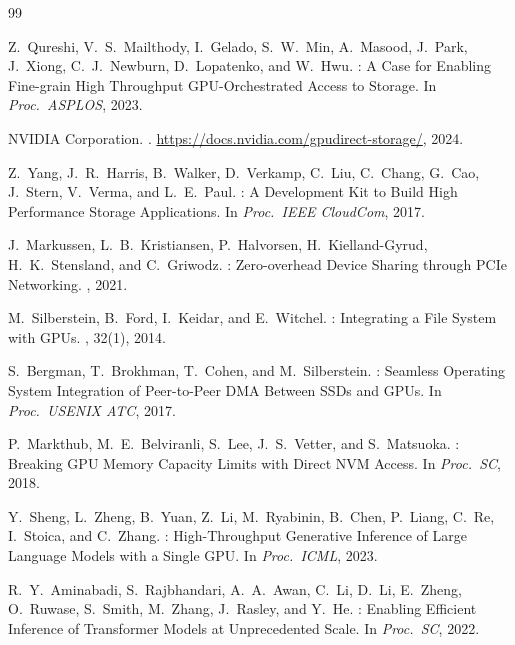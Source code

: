 \documentclass{article}
\begin{document}
\begin{thebibliography}{99}

Z.~Qureshi, V.~S.~Mailthody, I.~Gelado, S.~W.~Min, A.~Masood, J.~Park,
J.~Xiong, C.~J.~Newburn, D.~Lopatenko, and W.~Hwu.
: A Case for Enabling Fine-grain High Throughput
  {GPU}-Orchestrated Access to Storage.
\newblock In {\em Proc.\ ASPLOS}, 2023.

{NVIDIA Corporation}.
.
\newblock \url{https://docs.nvidia.com/gpudirect-storage/}, 2024.

Z.~Yang, J.~R.~Harris, B.~Walker, D.~Verkamp, C.~Liu, C.~Chang, G.~Cao,
J.~Stern, V.~Verma, and L.~E.~Paul.
: A Development Kit to Build High Performance Storage
  Applications.
\newblock In {\em Proc.\ IEEE CloudCom}, 2017.

J.~Markussen, L.~B.~Kristiansen, P.~Halvorsen, H.~Kielland-Gyrud,
H.~K.~Stensland, and C.~Griwodz.
: Zero-overhead Device Sharing through {PCIe} Networking.
, 2021.

M.~Silberstein, B.~Ford, I.~Keidar, and E.~Witchel.
: Integrating a File System with {GPUs}.
, 32(1), 2014.

S.~Bergman, T.~Brokhman, T.~Cohen, and M.~Silberstein.
: Seamless Operating System Integration of Peer-to-Peer {DMA}
  Between {SSDs} and {GPUs}.
\newblock In {\em Proc.\ USENIX ATC}, 2017.

P.~Markthub, M.~E.~Belviranli, S.~Lee, J.~S.~Vetter, and S.~Matsuoka.
: Breaking {GPU} Memory Capacity Limits with Direct {NVM}
  Access.
\newblock In {\em Proc.\ SC}, 2018.

Y.~Sheng, L.~Zheng, B.~Yuan, Z.~Li, M.~Ryabinin, B.~Chen, P.~Liang,
C.~Re, I.~Stoica, and C.~Zhang.
: High-Throughput Generative Inference of Large Language
  Models with a Single {GPU}.
\newblock In {\em Proc.\ ICML}, 2023.

R.~Y.~Aminabadi, S.~Rajbhandari, A.~A.~Awan, C.~Li, D.~Li, E.~Zheng,
O.~Ruwase, S.~Smith, M.~Zhang, J.~Rasley, and Y.~He.
: Enabling Efficient Inference of Transformer
  Models at Unprecedented Scale.
\newblock In {\em Proc.\ SC}, 2022.


\end{thebibliography}
\end{document}
